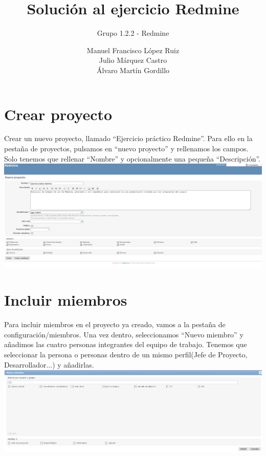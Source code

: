 \documentclass[a4paper,10pt]{scrartcl}
\title{Solución al ejercicio Redmine}
\subtitle{Grupo 1.2.2 - Redmine}
\author{
		Manuel Francisco López Ruiz\\
		Julio Márquez Castro\\
		Álvaro Martín Gordillo\\
		  }
\begin{document}
\clearpage\maketitle
\thispagestyle{empty}
\newpage

\newpage

\tableofcontents

\newpage

\section{Crear proyecto}

Crear un nuevo proyecto, llamado ``Ejercicio práctico Redmine''. Para ello en la pestaña de proyectos, pulsamos en ``nuevo proyecto'' y rellenamos los campos. Solo tenemos que rellenar ``Nombre'' y opcionalmente una pequeña ``Descripción''.\\


	\includegraphics[width=15cm]{crearProyecto}


\section{Incluir miembros}

Para incluir miembros en el proyecto ya creado, vamos a la pestaña de configuración/miembros. Una vez dentro, seleccionamos ``Nuevo miembro'' y añadimos las cuatro personas integrantes del equipo de trabajo. Tenemos que seleccionar la persona o personas dentro de un mismo perfil(Jefe de Proyecto, Desarrollador...) y añadirlas.\\


	\includegraphics[width=15cm]{AddMiembro}\\
\end{document}
